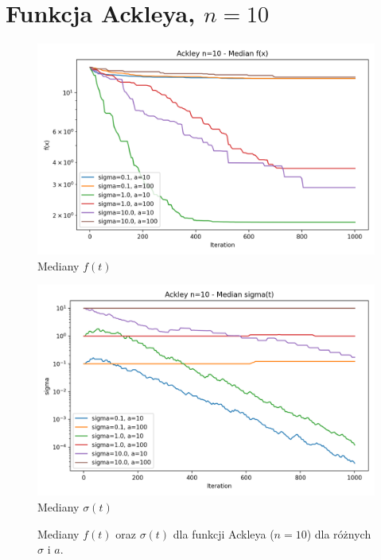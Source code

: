 \documentclass[a4paper,12pt]{article}
\begin{document}
\section{Funkcja Ackleya, $n=10$}
\begin{figure}[H]
    \centering
    \begin{minipage}{0.48\textwidth}
        \centering
        \includegraphics[width=\textwidth]{charts/Ackley_n10_all_medians.png}\\
        \small Mediany $f(t)$
    \end{minipage}\hfill
    \begin{minipage}{0.48\textwidth}
        \centering
        \includegraphics[width=\textwidth]{charts/Ackley_n10_all_sigmas.png}\\
        \small Mediany $\sigma(t)$
    \end{minipage}
    \caption{Mediany $f(t)$ oraz $\sigma(t)$ dla funkcji Ackleya ($n=10$) dla różnych $\sigma$ i $a$.}
\end{figure}
\end{document}
